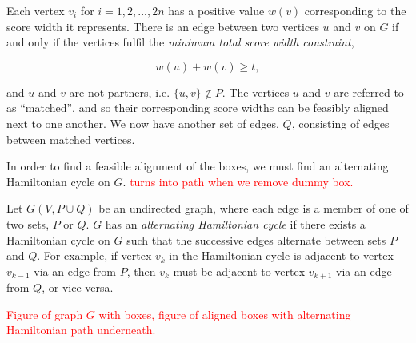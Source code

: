 \documentclass[oribibl]{llncs}
\begin{document}
Each vertex $v_i$ for $i = 1, 2, ..., 2n$ has a positive value $w(v)$ corresponding to the score width it represents. There is an edge between two vertices $u$ and $v$ on $G$ if and only if the vertices fulfil the \textit{minimum total score width constraint}, 

\begin{equation*}
w(u) + w(v) \geq t,
\end{equation*}

and $u$ and $v$ are not partners, i.e. $\{u, v\} \notin P$. The vertices $u$ and $v$ are referred to as ``matched'', and so their corresponding score widths can be feasibly aligned next to one another. We now have another set of edges, $Q$, consisting of edges between matched vertices.  

In order to find a feasible alignment of the boxes, we must find an alternating Hamiltonian cycle on $G$. \textcolor{red}{turns into path when we remove dummy box.}

\begin{definition}
	Let $G(V, P\cup Q)$ be an undirected graph, where each edge is a member of one of two sets, $P$ or $Q$. $G$ has an \textit{alternating Hamiltonian cycle} if there exists a Hamiltonian cycle on $G$ such that the successive edges alternate between sets $P$ and $Q$. For example, if vertex $v_k$ in the Hamiltonian cycle is adjacent to vertex $v_{k-1}$ via an edge from $P$, then $v_k$ must be adjacent to vertex $v_{k+1}$ via an edge from $Q$, or vice versa. 
\end{definition}

\textcolor{red}{Figure of graph $G$ with boxes, figure of aligned boxes with alternating Hamiltonian path underneath.}
\end{document}

